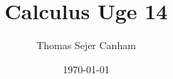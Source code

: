 \documentclass{article}
\title{Calculus Uge 14}
\author{Thomas Sejer Canham}
\date{\today}
\begin{document}
\begin{titlepage}
 \maketitle
 \thispagestyle{empty}
\end{titlepage}
\end{document}
